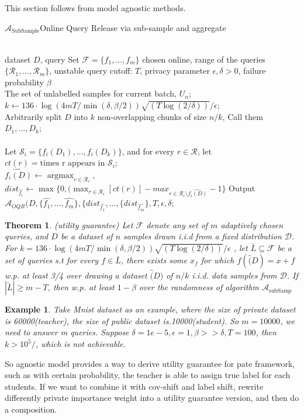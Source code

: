 \documentclass{article}
\newcommand{\argmax}{\mathop{\mathrm{argmax}}}
\def\cA{\mathcal{A}}
\def\cD{\mathcal{D}}
\def\cF{\mathcal{F}}
\def\cR{\mathcal{R}}
\def\cS{\mathcal{S}}
\newtheorem{theorem}{Theorem}
\newtheorem{example}{Example}
\theoremstyle{definition}
\begin{document}
This section follows from model agnostic methods.
\begin{algorithm}[htb] 
	\caption{ $\cA_{\text{SubSample}}$Online Query Release via sub-sample and aggregate}
	\label{alg:Framwork} 
	\begin{algorithmic}[1] 
		\REQUIRE ~~\\ 
		dataset $D$, query Set $\cF = \{f_1, ..., f_m\}$ chosen online, range of the queries $\{ \cR_1, ..., \cR_m\}$, unstable query cutoff: $T$, privacy parameter $\epsilon, \delta > 0$, failure probability $\beta$\\
		The set of unlabelled samples for current batch, $U_n$;\\
		$k \gets 136\cdot \log(4mT  /\min(\delta, \beta/2)) \sqrt{(T\log(2/\delta))}/\epsilon$;\\
		Arbitrarily split $D$ into $k$ non-overlapping chunks of size $n/k$, Call them $D_1, ..., D_k$;\\
		\ENSURE ~~\\
		\STATE Let $\cS_i = \{ f_i(D_1), ..., f_i(D_k)\} $, and for every $r \in \cR$, let $ct(r) = \text{times r appears in } \cS_i$;\\
		\STATE $ \hat{f_i(D)} \gets \argmax_{r \in \cR_i}$, $dist_{\hat{f_i}} \gets \max \{ 0, (\max_{r \in \cR_i}[ct(r)] - max_{r \in \cR_i \setminus \hat{f_i(D)}}-1 \}$
		\ENDFOR
		\STATE Output $\cA_{OQR}(D, \{\hat{f_1}, ..., \hat{f_m}\}, \{dist_{\hat{f_1}}, ..., \{dist_{\hat{f_m}}\}, T, \epsilon, \delta$; 
		\label{algorithm1}
	\end{algorithmic}
\end{algorithm}

\begin{theorem}(utility guarantee)
	Let $\cF$ denote any set of $m$ adaptively chosen queries, and $D$ be a dataset of $n$ samples drawn i.i.d from a fixed distribution $\cD$. For $ k = 136\cdot \log(4mT  /\min(\delta, \beta/2)) \sqrt{(T\log(2/\delta))}/\epsilon$ , let  $\bar{L} \subseteq  \cF$ be a set of queries s.t for every $f \in \bar{L}$, there exists some $x_f$ 
	for which $f(\hat(D)=x+f$ w.p. at least 3/4 over drawing a dataset $\hat(D)$ of $n/k$ i.i.d. data samples from $\cD$.  If $|\tilde{L}| \geq m-T$, then w.p. at least $1 -\beta$ over the randomness of algorithm $\cA_{\text{subSamp}}$
\end{theorem}

\begin{example}
	Take Mnist dataset as an example, where the size of private dataset is 60000(teacher), the size of public dataset is.10000(student). So $m=10000$, we need to answer m queries. Suppose $\delta = 1e-5, \epsilon = 1, \beta >> \delta, T = 100$, then $ k > 10^5/$, which is not achievable.
\end{example}
So agnostic model provides a way to derive utility guarantee for pate framework, such as with certain probability, the teacher is able to assign true label for each students.  If we want to combine it with cov-shift and label shift, rewrite differently private importance weight into a utility guarantee version, and then do a composition.
\end{document}
